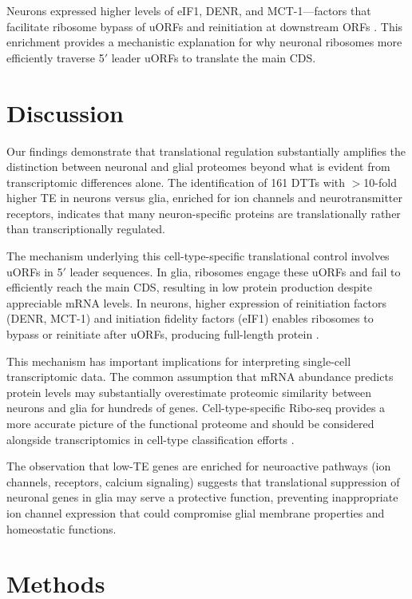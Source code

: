 \documentclass[11pt]{article}
\begin{document}
Neurons expressed higher levels of eIF1, DENR, and MCT-1---factors that facilitate ribosome bypass of uORFs and reinitiation at downstream ORFs \citep{eif1_scanning2015, denr_mct1_2014}. This enrichment provides a mechanistic explanation for why neuronal ribosomes more efficiently traverse 5$'$ leader uORFs to translate the main CDS.

\section{Discussion}

Our findings demonstrate that translational regulation substantially amplifies the distinction between neuronal and glial proteomes beyond what is evident from transcriptomic differences alone. The identification of 161 DTTs with $>$10-fold higher TE in neurons versus glia, enriched for ion channels and neurotransmitter receptors, indicates that many neuron-specific proteins are translationally rather than transcriptionally regulated.

The mechanism underlying this cell-type-specific translational control involves uORFs in 5$'$ leader sequences. In glia, ribosomes engage these uORFs and fail to efficiently reach the main CDS, resulting in low protein production despite appreciable mRNA levels. In neurons, higher expression of reinitiation factors (DENR, MCT-1) and initiation fidelity factors (eIF1) enables ribosomes to bypass or reinitiate after uORFs, producing full-length protein \citep{hinnebusch2014uorf, denr_mct1_2014}.

This mechanism has important implications for interpreting single-cell transcriptomic data. The common assumption that mRNA abundance predicts protein levels may substantially overestimate proteomic similarity between neurons and glia for hundreds of genes. Cell-type-specific Ribo-seq provides a more accurate picture of the functional proteome and should be considered alongside transcriptomics in cell-type classification efforts \citep{trapnell2015single}.

The observation that low-TE genes are enriched for neuroactive pathways (ion channels, receptors, calcium signaling) suggests that translational suppression of neuronal genes in glia may serve a protective function, preventing inappropriate ion channel expression that could compromise glial membrane properties and homeostatic functions.

\section{Methods}
\end{document}
